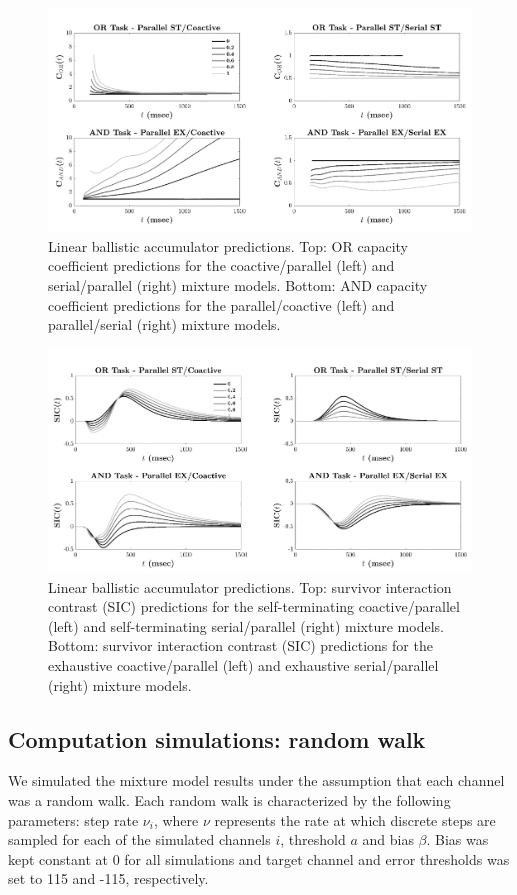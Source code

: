 \begin{figure}[htb]
\centering
\includegraphics[scale=.6]{Figures/Mix/Figure_B1v3.pdf}
\caption{Linear ballistic accumulator predictions. Top: OR capacity coefficient predictions for the coactive/parallel (left) and serial/parallel (right) mixture models. Bottom: AND capacity coefficient predictions for the parallel/coactive (left) and parallel/serial (right) mixture models.}
\label{fig:capLBAmixture}
\end{figure}

\begin{figure}[htb]
\centering
\includegraphics[scale=.6]{Figures/Mix/Figure_B2.pdf}
\caption{Linear ballistic accumulator predictions. Top: survivor interaction contrast (SIC) predictions for the self-terminating coactive/parallel (left) and self-terminating serial/parallel (right) mixture models. Bottom: survivor interaction contrast (SIC) predictions for the exhaustive coactive/parallel (left) and exhaustive serial/parallel (right) mixture models.}
\label{fig:sicLBAmixture}
\end{figure}


\subsection{Computation simulations: random walk}
We simulated the mixture model results under the assumption that each channel was a random walk. Each random walk is characterized by the following parameters: step rate $\nu_i$, where $\nu$ represents the rate at which discrete steps are sampled for each of the simulated channels $i$, threshold $a$ and bias $\beta$. Bias was kept constant at 0 for all simulations and target channel and error thresholds was set to 115 and -115, respectively.


